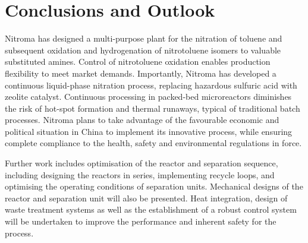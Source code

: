 \section{Conclusions and Outlook}
\label{sec:conclu}
Nitroma has designed a multi-purpose plant for the nitration of toluene and subsequent oxidation and hydrogenation of nitrotoluene isomers to valuable substituted amines.
Control of nitrotoluene oxidation enables production flexibility to meet market demands.
Importantly, Nitroma has developed a continuous liquid-phase nitration process, replacing hazardous sulfuric acid with zeolite catalyst.
Continuous processing in packed-bed microreactors diminishes the risk of hot-spot formation and thermal runaways, typical of traditional batch processes.
Nitroma plans to take advantage of the favourable economic and political situation in China to implement its innovative process, while ensuring complete compliance to the health, safety and environmental regulations in force.

Further work includes optimisation of the reactor and separation sequence, including designing the reactors in series, implementing recycle loops, and optimising the operating conditions of separation units. Mechanical designs of the reactor and separation unit will also be presented. Heat integration, design of waste treatment systems as well as the establishment of a robust control system will be undertaken to improve the performance and inherent safety for the process.
